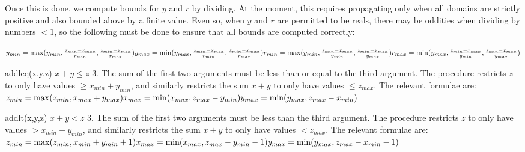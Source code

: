 	Once this is done, we compute bounds for $y$ and $r$ by dividing.  At the moment, this requires propagating
	only when all domains are strictly positive and also bounded above by a finite value.  Even so, when
	$y$ and $r$ are permitted to be reals, there may be oddities when dividing by numbers $<1$, so the
	following must be done to ensure that all bounds are computed correctly:

	$y_{min} = \max(y_{min},\frac{z_{min}-x_{max}}{r_{min}},\frac{z_{min}-x_{max}}{r_{max}})\\
	y_{max} = \min(y_{max},\frac{z_{min}-x_{max}}{r_{min}},\frac{z_{min}-x_{max}}{r_{max}})\\
	r_{min} = \max(y_{min},\frac{z_{min}-x_{max}}{y_{min}},\frac{z_{min}-x_{max}}{y_{max}})\\
	r_{max} = \min(y_{max},\frac{z_{min}-x_{max}}{y_{min}},\frac{z_{min}-x_{max}}{y_{max}})\\$

    {addleq(x,y,z)}
    {$x+y \leq z$}
    {3.  The sum of the first two arguments must be less than or equal to the third argument.}
    {The procedure restricts $z$ to only have values $ \geq x_{min}+y_{min}$,
    and similarly restricts the sum $x+y$ to only have values $ \leq z_{max}$.
    The relevant formulae are:\\
    $z_{min} = \max(z_{min},x_{max}+y_{max})\\
    x_{max} = \min(x_{max},z_{max}-y_{min})\\
    y_{max} = \min(y_{max},z_{max}-x_{min})$}

    {addlt(x,y,z)}
    {$x+y<z$}
    {3.  The sum of the first two arguments must be less than the third argument.}
    {The procedure restricts $z$ to only have values $>x_{min}+y_{min}$,
    and similarly restricts the sum $x+y$ to only have values $<z_{max}$.  The relevant
    formulae are:\\
    $z_{min} = \max(z_{min},x_{min}+y_{min}+1)\\
    x_{max} = \min(x_{max},z_{max}-y_{min}-1)\\
    y_{max} = \min(y_{max},z_{max}-x_{min}-1)$}


